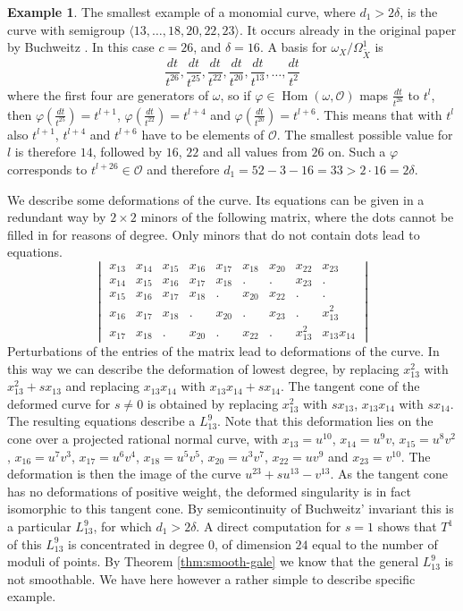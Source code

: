 \documentclass{amsart}
\DeclareMathOperator{\Hom}{Hom}
\newcommand{\mO}{\mathcal{O}}
\theoremstyle{definition}
\newtheorem{ex}[thm]{Example}
\theoremstyle{remark}
\begin{document}
\begin{ex} \label{ex:buchcurv}
The smallest example of a monomial curve, where $d_1>2\delta$, is the curve
with semigroup $\langle 13,\dots,18, 20,22,23 \rangle$. It occurs already
in the original paper by Buchweitz \cite{Bu}.
In this case $c=26$, and $\delta=16$.
A basis for $\omega_X/\Omega^1_{\widetilde X}$ is
\[
\frac{dt}{t^{26}}, \frac{dt}{t^{25}},\frac{dt}{t^{22}},\frac{dt}{t^{20}},
\frac{dt}{t^{13}},\dots,\frac{dt}{t^{2}}
\]
where the first four are generators of $\omega$,
so if $\varphi \in \Hom(\omega,\mO)$ maps $\frac{dt}{t^{26}}$ to $t^l$, then 
$\varphi(\frac{dt}{t^{25}})=t^{l+1}$, $\varphi(\frac{dt}{t^{22}})=t^{l+4}$ and
$\varphi(\frac{dt}{t^{20}})=t^{l+6}$. This means that with $t^l$
also $t^{l+1}$, $t^{l+4}$ and $t^{l+6}$ have to be elements of $\mO$.
The smallest possible value for $l$ is therefore $14$, followed by $16$, $22$ and 
all values from $26$ on. Such a $\varphi$ corresponds to $t^{l+26}\in \mO$
and therefore $d_1=52-3-16=33>2\cdot16=2\delta$.

We describe some deformations of the curve.
Its equations can be given in a redundant way by $2\times 2$ minors of the following
matrix, where the dots cannot be filled in for reasons of degree. Only minors
that do not contain dots lead to equations.
\[
\begin{vmatrix}
x_{13}& x_{14}& x_{15} & x_{16} & x_{17} & x_{18} & x_{20} & x_{22} & x_{23}\\
x_{14}& x_{15} & x_{16} & x_{17} & x_{18} & .        & .      & x_{23}& .\\
x_{15} & x_{16} & x_{17} & x_{18} & .        & x_{20} & x_{22}& .   &. \\
 x_{16} & x_{17} & x_{18} & .        & x_{20} &. & x_{23}& .   &x_{13}^2\\
 x_{17} & x_{18} & .        & x_{20} & . &x_{22}& .   &x_{13}^2 & x_{13}x_{14}
 \end{vmatrix}
\]
Perturbations of the entries of the matrix lead to deformations of the curve.
In this way we can describe the deformation of lowest degree, by
replacing   $x_{13}^2$  with $x_{13}^2+sx_{13}$ and replacing 
 $x_{13}x_{14}$  with $x_{13}x_{14}+sx_{14}$.  
The  tangent cone of the deformed curve for $s\neq 0$ is obtained by 
 replacing  $x_{13}^2$ with $sx_{13}$,
 $x_{13}x_{14}$ with $sx_{14}$. The resulting  equations describe a  $L_{13}^9$.
 Note that this deformation lies on the cone over a  projected  rational normal curve,
 with $x_{13}=u^{10}$, $x_{14}=u^9v$,  $x_{15}=u^8v^2$,  $x_{16}=u^7v^3$, 
  $x_{17}=u^6v^4$, $x_{18}=u^5v^5$,  $x_{20}=u^3v^7$,   $x_{22}=uv^9$ 
  and $x_{23}=v^{10}$.
  The deformation is then the image of the curve $u^{23}+su^{13}-v^{13}$.
As the tangent cone has no deformations of positive weight, the deformed singularity
is in fact isomorphic to this tangent cone. By semicontinuity of Buchweitz' invariant this is 
a particular $L_{13}^9$, for which $d_1>2\delta$. A direct computation for $s=1$ shows
that $T^1$ of this $L_{13}^9$
is concentrated in degree 0, of dimension $24$ equal to the number of moduli of points. By 
Theorem \ref{thm:smooth-gale} we know that the general 
$L_{13}^9$ is not  smoothable. 
We have here however a rather simple to describe specific example. 
\end{ex}
\end{document}

